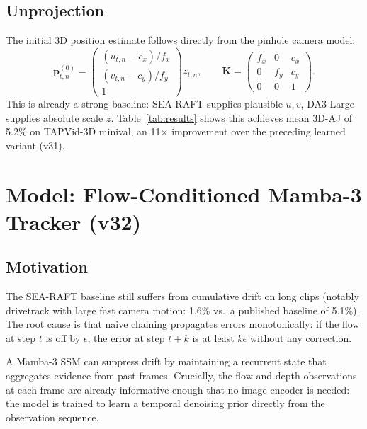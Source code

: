 \documentclass[11pt,a4paper]{article}
\begin{document}
\subsection{Unprojection}

The initial 3D position estimate follows directly from the pinhole
camera model:
\begin{equation}\label{eq:unproject}
  \bm{p}_{t,n}^{(0)} =
  \begin{pmatrix}
    (u_{t,n} - c_x) / f_x \\
    (v_{t,n} - c_y) / f_y \\
    1
  \end{pmatrix}
  z_{t,n},
  \qquad
  \bm{K} = \begin{pmatrix} f_x & 0 & c_x \\ 0 & f_y & c_y \\ 0 & 0 & 1 \end{pmatrix}.
\end{equation}
This is already a strong baseline: SEA-RAFT supplies plausible $u, v$,
DA3-Large supplies absolute scale $z$. Table~\ref{tab:results} shows
this achieves mean 3D-AJ of 5.2\% on TAPVid-3D minival,
an 11$\times$ improvement over the preceding learned variant (v31).

\section{Model: Flow-Conditioned Mamba-3 Tracker (v32)}

\subsection{Motivation}

The SEA-RAFT baseline still suffers from cumulative drift on long clips
(notably drivetrack with large fast camera motion: 1.6\% vs.\ a
published baseline of 5.1\%). The root cause is that naive chaining
propagates errors monotonically: if the flow at step $t$ is off by
$\epsilon$, the error at step $t + k$ is at least $k\epsilon$ without
any correction.

A Mamba-3 SSM can suppress drift by maintaining a recurrent state that
aggregates evidence from past frames. Crucially, the flow-and-depth
observations at each frame are already informative enough that no
image encoder is needed: the model is trained to learn a temporal
denoising prior directly from the observation sequence.
\end{document}
